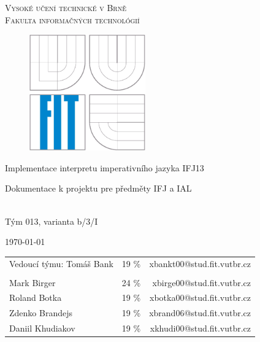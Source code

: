 \begin{titlepage}

\begin{center}

\LARGE
\textsc{Vysoké učení technické v Brně \\ Fakulta informačných technológií}
\end{center}

\begin{figure}[!h]
\centering
\includegraphics[height=5cm]{img/logo.eps}
\end{figure}

\bigskip

\begin{center}
\begin{Huge}
Implementace interpretu imperativního jazyka IFJ13\\
\end{Huge}

\bigskip

\begin{Large}
Dokumentace k projektu pre předměty IFJ a IAL
\end{Large}             \\
\smallskip
\smallskip
\smallskip
Tým 013, varianta b/3/I
\end{center}

\vfill

\begin{center}
\begin{Large}
\today
\end{Large}
\end{center}

\vfill  
\begin{table}[b]

\tabcolsep=12pt
  \begin{tabular}{l c r }
Vedoucí týmu: Tomáš Bank & 19 \% & \qquad  xbankt00@stud.fit.vutbr.cz\\
&  &  \\
Mark Birger & 24 \% & \qquad \qquad \qquad \qquad \qquad  \qquad \qquad xbirge00@stud.fit.vutbr.cz\\
Roland Botka & 19 \% & xbotka00@stud.fit.vutbr.cz\\
Zdenko Brandejs & 19 \% & xbrand06@stud.fit.vutbr.cz\\
Daniil Khudiakov & 19 \% & xkhudi00@stud.fit.vutbr.cz\\
\end{tabular}

\end{table}

\end{titlepage}
